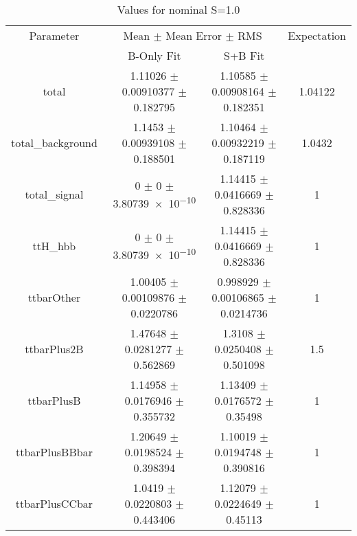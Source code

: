 \begin{table}
\centering
\caption{Values for nominal S=1.0}
\begin{tabular}{cccc}
\toprule
Parameter & \multicolumn{2}{c}{Mean $\pm$ Mean Error $\pm$ RMS} & Expectation\\
 & B-Only Fit & S+B Fit & \\
\midrule
total & \num{1.11026} $\pm$ \num{0.00910377} $\pm$ \num{0.182795} & \num{1.10585} $\pm$ \num{0.00908164} $\pm$ \num{0.182351} & \num{1.04122}\\
total\_background & \num{1.1453} $\pm$ \num{0.00939108} $\pm$ \num{0.188501} & \num{1.10464} $\pm$ \num{0.00932219} $\pm$ \num{0.187119} & \num{1.0432}\\
total\_signal & \num{0} $\pm$ \num{0} $\pm$ \num{3.80739e-10} & \num{1.14415} $\pm$ \num{0.0416669} $\pm$ \num{0.828336} & \num{1}\\
ttH\_hbb & \num{0} $\pm$ \num{0} $\pm$ \num{3.80739e-10} & \num{1.14415} $\pm$ \num{0.0416669} $\pm$ \num{0.828336} & \num{1}\\
ttbarOther & \num{1.00405} $\pm$ \num{0.00109876} $\pm$ \num{0.0220786} & \num{0.998929} $\pm$ \num{0.00106865} $\pm$ \num{0.0214736} & \num{1}\\
ttbarPlus2B & \num{1.47648} $\pm$ \num{0.0281277} $\pm$ \num{0.562869} & \num{1.3108} $\pm$ \num{0.0250408} $\pm$ \num{0.501098} & \num{1.5}\\
ttbarPlusB & \num{1.14958} $\pm$ \num{0.0176946} $\pm$ \num{0.355732} & \num{1.13409} $\pm$ \num{0.0176572} $\pm$ \num{0.35498} & \num{1}\\
ttbarPlusBBbar & \num{1.20649} $\pm$ \num{0.0198524} $\pm$ \num{0.398394} & \num{1.10019} $\pm$ \num{0.0194748} $\pm$ \num{0.390816} & \num{1}\\
ttbarPlusCCbar & \num{1.0419} $\pm$ \num{0.0220803} $\pm$ \num{0.443406} & \num{1.12079} $\pm$ \num{0.0224649} $\pm$ \num{0.45113} & \num{1}\\
\bottomrule
\end{tabular}
\end{table}